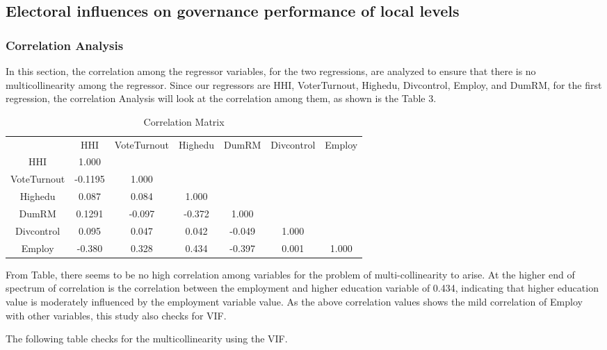 \subsection{Electoral influences on governance performance of local levels}
\subsubsection{Correlation Analysis}
In this section, the correlation among the regressor variables, for the two regressions, are analyzed to ensure that there is no multicollinearity among the regressor. Since our regressors are HHI, VoterTurnout, Highedu, Divcontrol, Employ, and DumRM, for the first regression, the correlation Analysis will look at the correlation among them, as shown is the Table 3.\\
\begin{table}[ht]
\centering
\begin{tabular}{ccccccc}

    & HHI & VoteTurnout & Highedu & DumRM & Divcontrol & Employ\\ 
HHI & 1.000 &  &  &  & &  \\ 
VoteTurnout & -0.1195 & 1.000 & &  & &  \\ 
Highedu & 0.087 & 0.084 & 1.000& & & \\ 
DumRM & 0.1291 & -0.097 & -0.372 & 1.000 & & \\ 
Divcontrol & 0.095 & 0.047 & 0.042 & -0.049 & 1.000 & \\ 
Employ & -0.380 & 0.328 & 0.434 & -0.397 & 0.001 & 1.000 \\
\end{tabular}
\caption{Correlation Matrix}
\label{Correlation Matrix}
\end{table}
From Table, there seems to be no high correlation among variables for the problem of multi-collinearity to arise. At the higher end of spectrum of correlation is the correlation between the employment  and higher education variable of 0.434, indicating that higher education value is moderately influenced by the employment variable value. As the above correlation values shows the mild correlation of Employ with other variables, this study also checks for VIF.   \par
The following table checks for the multicollinearity using the VIF. 
